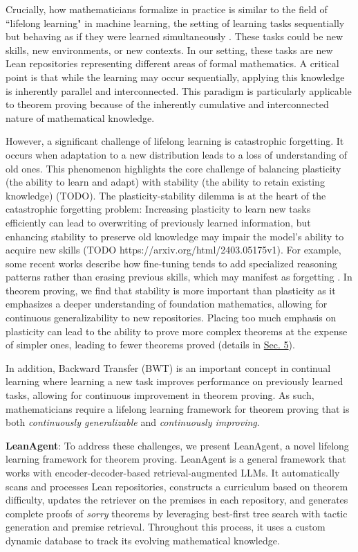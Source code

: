 \documentclass{article} %
\begin{document}
Crucially, how mathematicians formalize in practice is similar to the field of ``lifelong learning" in machine learning, the setting of learning tasks sequentially but behaving as if they were learned simultaneously \citep{wangComprehensiveSurveyContinual2024}. These tasks could be new skills, new environments, or new contexts. In our setting, these tasks are new Lean repositories representing different areas of formal mathematics. A critical point is that while the learning may occur sequentially, applying this knowledge is inherently parallel and interconnected. This paradigm is particularly applicable to theorem proving because of the inherently cumulative and interconnected nature of mathematical knowledge.

However, a significant challenge of lifelong learning is catastrophic forgetting. It occurs when adaptation to a new distribution leads to a loss of understanding of old ones. This phenomenon highlights the core challenge of balancing plasticity (the ability to learn and adapt) with stability (the ability to retain existing knowledge) (TODO). The plasticity-stability dilemma is at the heart of the catastrophic forgetting problem: Increasing plasticity to learn new tasks efficiently can lead to overwriting of previously learned information, but enhancing stability to preserve old knowledge may impair the model's ability to acquire new skills (TODO https://arxiv.org/html/2403.05175v1). For example, some recent works describe how fine-tuning tends to add specialized reasoning patterns rather than erasing previous skills, which may manifest as forgetting \citep{jiangInterpretableCatastrophicForgetting2024}. In theorem proving, we find that stability is more important than plasticity as it emphasizes a deeper understanding of foundation mathematics, allowing for continuous generalizability to new repositories. Placing too much emphasis on plasticity can lead to the ability to prove more complex theorems at the expense of simpler ones, leading to fewer theorems proved (details in \hyperref[sec:experiments]{Sec. 5}).

In addition, Backward Transfer (BWT) is an important concept in continual learning where learning a new task improves performance on previously learned tasks, allowing for continuous improvement in theorem proving. As such, mathematicians require a lifelong learning framework for theorem proving that is both \textit{continuously generalizable} and \textit{continuously improving}.

\textbf{LeanAgent}: To address these challenges, we present LeanAgent, a novel lifelong learning framework for theorem proving. LeanAgent is a general framework that works with encoder-decoder-based retrieval-augmented LLMs. It automatically scans and processes Lean repositories, constructs a curriculum based on theorem difficulty, updates the retriever on the premises in each repository, and generates complete proofs of \textit{sorry} theorems by leveraging best-first tree search with tactic generation and premise retrieval. Throughout this process, it uses a custom dynamic database to track its evolving mathematical knowledge.
\end{document}
